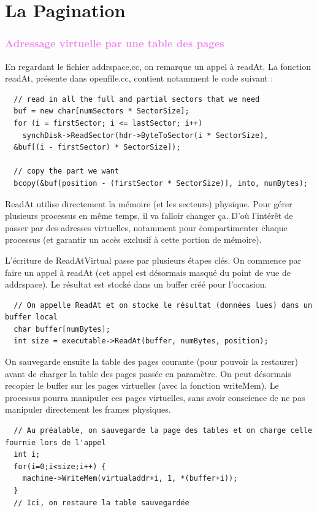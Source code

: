 \documentclass[a4paper,10pt]{report}
\begin{document}
  \part{La Pagination}
  \textcolor{Violet}{\section{Adressage virtuelle par une table des pages}}

  En regardant le fichier addrspace.cc, on remarque un appel à readAt. La fonction readAt, présente dans openfile.cc, contient notamment le code suivant :

  \begin{lstlisting}
  // read in all the full and partial sectors that we need
  buf = new char[numSectors * SectorSize];
  for (i = firstSector; i <= lastSector; i++) 
    synchDisk->ReadSector(hdr->ByteToSector(i * SectorSize), 
  &buf[(i - firstSector) * SectorSize]);

  // copy the part we want
  bcopy(&buf[position - (firstSector * SectorSize)], into, numBytes);
  \end{lstlisting}

  ReadAt utilise directement la mémoire (et les secteurs) physique. Pour gérer plusieurs processus en même temps, il va falloir changer ça. D'où l'intérêt de passer par des adresses virtuelles, notamment pour \"compartimenter \" chaque processus (et garantir un accès exclusif à cette portion de mémoire).

  L'écriture de ReadAtVirtual passe par plusieurs étapes clés. On commence par faire un appel à readAt (cet appel est désormais masqué du point de vue de addrspace). Le résultat est stocké dans un buffer créé pour l'occasion.

  \begin{lstlisting}
  // On appelle ReadAt et on stocke le résultat (données lues) dans un buffer local
  char buffer[numBytes];
  int size = executable->ReadAt(buffer, numBytes, position);
  \end{lstlisting}

  On sauvegarde ensuite la table des pages courante (pour pouvoir la restaurer) avant de charger la table des pages passée en paramètre. On peut désormais recopier le buffer sur les pages virtuelles (avec la fonction writeMem). Le processus pourra manipuler ces pages virtuelles, sans avoir conscience de ne pas manipuler directement les frames physiques.

  \begin{lstlisting}
  // Au préalable, on sauvegarde la page des tables et on charge celle fournie lors de l'appel
  int i;
  for(i=0;i<size;i++) {
    machine->WriteMem(virtualaddr+i, 1, *(buffer+i));
  }
  // Ici, on restaure la table sauvegardée
  \end{lstlisting}
\end{document}
